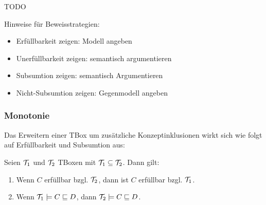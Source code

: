 \begin{tafel}
    TODO
\end{tafel}

Hinweise für Beweisstrategien:
\begin{itemize}
\item Erfüllbarkeit zeigen: Modell angeben
\item Unerfüllbarkeit zeigen: semantisch argumentieren
\item Subsumtion zeigen: semantisch Argumentieren
\item Nicht-Subsumtion zeigen: Gegenmodell angeben
\end{itemize}

\subsubsection{Monotonie}\label{monotonie}
Das Erweitern einer TBox um zusätzliche Konzeptinklusionen wirkt sich wie folgt auf Erfüllbarkeit und Subsumtion aus:

\begin{lemma}
\label{lem:tbox-monoton}
Seien $\mathcal{T}_{1}$ und $\mathcal{T}_{2}$ TBoxen mit $\mathcal{T}_{1} \subseteq \mathcal{T}_{2}$. Dann gilt:
\begin{enumerate}
\item
  Wenn $C$ erfüllbar bzgl. $\mathcal{T}_{2}$, dann ist $C$ erfüllbar bzgl.
  $\mathcal{T}_{1}$.
\item
  Wenn $\mathcal{T}_{1} \models C \sqsubseteq D$, dann
  $\mathcal{T}_{2} \models C \sqsubseteq D$.
\end{enumerate}
\end{lemma}

